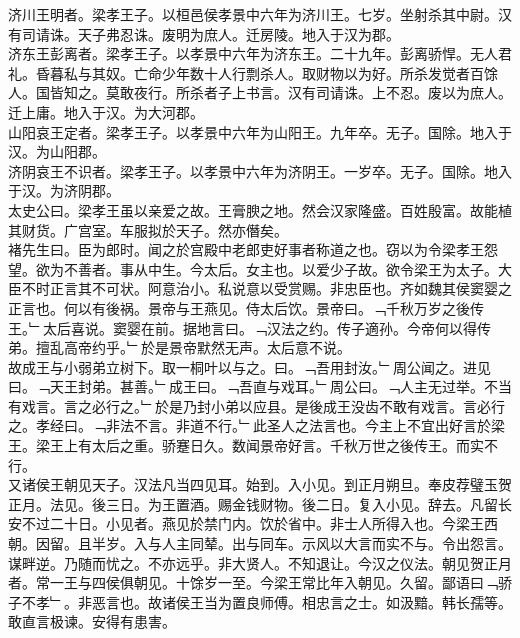 \documentclass{zhvt-classic}
\begin{document}
\hspace*{2em}济川王明者。梁孝王子。以桓邑侯孝景中六年为济川王。七岁。坐射杀其中尉。汉有司请诛。天子弗忍诛。废明为庶人。迁房陵。地入于汉为郡。\\
\hspace*{2em}济东王彭离者。梁孝王子。以孝景中六年为济东王。二十九年。彭离骄悍。无人君礼。昏暮私与其奴。亡命少年数十人行剽杀人。取财物以为好。所杀发觉者百馀人。国皆知之。莫敢夜行。所杀者子上书言。汉有司请诛。上不忍。废以为庶人。迁上庸。地入于汉。为大河郡。\\
\hspace*{2em}山阳哀王定者。梁孝王子。以孝景中六年为山阳王。九年卒。无子。国除。地入于汉。为山阳郡。\\
\hspace*{2em}济阴哀王不识者。梁孝王子。以孝景中六年为济阴王。一岁卒。无子。国除。地入于汉。为济阴郡。\\
\hspace*{2em}太史公曰。梁孝王虽以亲爱之故。王膏腴之地。然会汉家隆盛。百姓殷富。故能植其财货。广宫室。车服拟於天子。然亦僭矣。\\
\hspace*{2em}褚先生曰。臣为郎时。闻之於宫殿中老郎吏好事者称道之也。窃以为令梁孝王怨望。欲为不善者。事从中生。今太后。女主也。以爱少子故。欲令梁王为太子。大臣不时正言其不可状。阿意治小。私说意以受赏赐。非忠臣也。齐如魏其侯窦婴之正言也。何以有後祸。景帝与王燕见。侍太后饮。景帝曰。﹁千秋万岁之後传王。﹂太后喜说。窦婴在前。据地言曰。﹁汉法之约。传子適孙。今帝何以得传弟。擅乱高帝约乎。﹂於是景帝默然无声。太后意不说。\\
\hspace*{2em}故成王与小弱弟立树下。取一桐叶以与之。曰。﹁吾用封汝。﹂周公闻之。进见曰。﹁天王封弟。甚善。﹂成王曰。﹁吾直与戏耳。﹂周公曰。﹁人主无过举。不当有戏言。言之必行之。﹂於是乃封小弟以应县。是後成王没齿不敢有戏言。言必行之。孝经曰。﹁非法不言。非道不行。﹂此圣人之法言也。今主上不宜出好言於梁王。梁王上有太后之重。骄蹇日久。数闻景帝好言。千秋万世之後传王。而实不行。\\
\hspace*{2em}又诸侯王朝见天子。汉法凡当四见耳。始到。入小见。到正月朔旦。奉皮荐璧玉贺正月。法见。後三日。为王置酒。赐金钱财物。後二日。复入小见。辞去。凡留长安不过二十日。小见者。燕见於禁门内。饮於省中。非士人所得入也。今梁王西朝。因留。且半岁。入与人主同辇。出与同车。示风以大言而实不与。令出怨言。谋畔逆。乃随而忧之。不亦远乎。非大贤人。不知退让。今汉之仪法。朝见贺正月者。常一王与四侯俱朝见。十馀岁一至。今梁王常比年入朝见。久留。鄙语曰﹁骄子不孝﹂。非恶言也。故诸侯王当为置良师傅。相忠言之士。如汲黯。韩长孺等。敢直言极谏。安得有患害。\\
\end{document}
